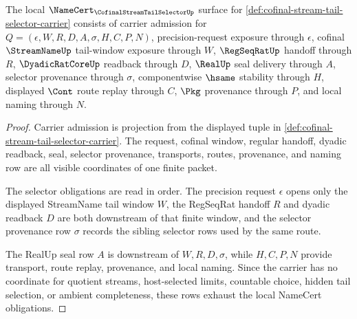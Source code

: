 \begin{theorem}
\label{thm:cofinal-stream-tail-selector-namecert-obligations}
The local $\NameCert_{\CofinalStreamTailSelectorUp}$ surface for \autoref{def:cofinal-stream-tail-selector-carrier} consists of carrier admission for $Q=(\epsilon,W,R,D,A,\sigma,H,C,P,N)$, precision-request exposure through $\epsilon$, cofinal $\StreamNameUp$ tail-window exposure through $W$, $\RegSeqRatUp$ handoff through $R$, $\DyadicRatCoreUp$ readback through $D$, $\RealUp$ seal delivery through $A$, selector provenance through $\sigma$, componentwise $\hsame$ stability through $H$, displayed $\Cont$ route replay through $C$, $\Pkg$ provenance through $P$, and local naming through $N$.
\end{theorem}
\begin{proof}
Carrier admission is projection from the displayed tuple in \autoref{def:cofinal-stream-tail-selector-carrier}. The request, cofinal window, regular handoff, dyadic readback, seal, selector provenance, transports, routes, provenance, and naming row are all visible coordinates of one finite packet.

The selector obligations are read in order. The precision request $\epsilon$ opens only the displayed StreamName tail window $W$, the RegSeqRat handoff $R$ and dyadic readback $D$ are both downstream of that finite window, and the selector provenance row $\sigma$ records the sibling selector rows used by the same route.

The RealUp seal row $A$ is downstream of $W,R,D,\sigma$, while $H,C,P,N$ provide transport, route replay, provenance, and local naming. Since the carrier has no coordinate for quotient streams, host-selected limits, countable choice, hidden tail selection, or ambient completeness, these rows exhaust the local NameCert obligations.
\end{proof}

